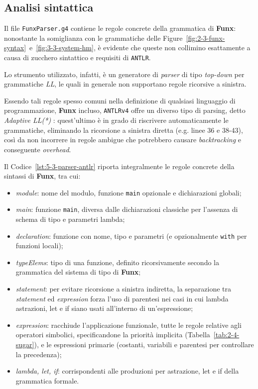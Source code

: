 \subsection{Analisi sintattica}
\label{sec:5-3-syntactic-analysis}

Il file \texttt{FunxParser.g4} contiene le regole concrete della grammatica di \textbf{Funx}:
nonostante la somiglianza con le grammatiche delle Figure~\ref{fig:2-3-funx-syntax}~e~\ref{fig:3-3-system-hm},
è evidente che queste non collimino esattamente a causa di zucchero sintattico e requisiti di \texttt{ANTLR}.

\noindent Lo strumento utilizzato, infatti, è un generatore di \textit{parser} di tipo \textit{top-down}
per grammatiche \textit{LL}, le quali in generale non supportano regole ricorsive a sinistra.

\noindent Essendo tali regole spesso comuni nella definizione di qualsiasi linguaggio di programmazione, \textbf{Funx} incluso,
\texttt{ANTLRv4} offre un diverso tipo di parsing, detto \textit{Adaptive LL(*)} \cite{Parr-2011-FoundationANTLR,Parr-2014-AdaptiveLL}:
quest'ultimo è in grado di riscrivere automaticamente le grammatiche, eliminando la ricorsione a sinistra diretta (e.g. linee 36 e 38-43),
così da non incorrere in regole ambigue che potrebbero causare \textit{backtracking} e conseguente \textit{overhead}.

\noindent Il Codice~\ref{lst:5-3-parser-antlr} riporta integralmente le regole concrete della sintassi di \textbf{Funx}, tra cui:
\begin{itemize}
    \item \textit{module}: nome del modulo, funzione \texttt{main} opzionale e dichiarazioni globali;
    \item \textit{main}: funzione \texttt{main}, diversa dalle dichiarazioni classiche per l'assenza di schema di tipo e parametri lambda;
    \item \textit{declaration}: funzione con nome, tipo e parametri (e opzionalmente \texttt{with} per funzioni locali);
    \item \textit{typeElems}: tipo di una funzione, definito ricorsivamente secondo la grammatica del sistema di tipo di \textbf{Funx};
    \item \textit{statement}: per evitare ricorsione a sinistra indiretta, la separazione tra \textit{statement} ed \textit{expression}
          forza l'uso di parentesi nei casi in cui lambda astrazioni, let e if siano usati all'interno di un'espressione;
    \item \textit{expression}: racchiude l'applicazione funzionale, tutte le regole relative agli operatori simbolici,
          specificandone la priorità implicita (Tabella~\ref{tab:2-4-sugar}), e le espressioni primarie
          (costanti, variabili e parentesi per controllare la precedenza);
    \item \textit{lambda, let, if}: corrispondenti alle produzioni per astrazione, let e if della grammatica formale.
\end{itemize}


